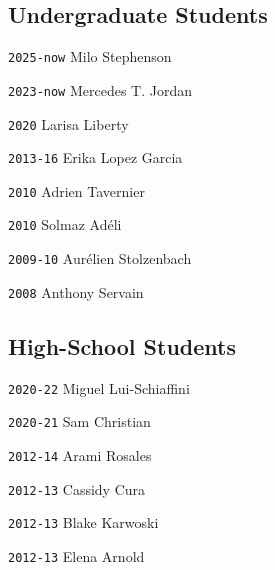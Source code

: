 
\vspace{-1em}
\subsection*{Undergraduate Students}

\noindent \texttt{2025-now} \tab Milo Stephenson

\noindent \texttt{2023-now} \tab Mercedes T. Jordan

\noindent \texttt{2020} \tab Larisa Liberty

\noindent \texttt{2013-16} \tab Erika Lopez Garcia

\noindent \texttt{2010} \tab Adrien Tavernier

\noindent \texttt{2010} \tab Solmaz Adéli

\noindent \texttt{2009-10} \tab Aurélien Stolzenbach

\noindent \texttt{2008} \tab Anthony Servain

\vspace{-1em}
\subsection*{High-School Students}

\noindent \texttt{2020-22} \tab Miguel Lui-Schiaffini

\noindent \texttt{2020-21} \tab Sam Christian

\noindent \texttt{2012-14} \tab Arami Rosales

\noindent \texttt{2012-13} \tab Cassidy Cura

\noindent \texttt{2012-13} \tab Blake Karwoski

\noindent \texttt{2012-13} \tab Elena Arnold

